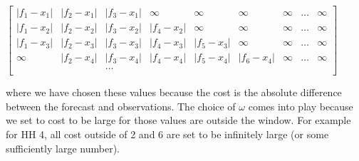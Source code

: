 \documentclass[a4paper]{article}
\begin{document}
\centerline{$\begin{bmatrix}
    |f_1 - x_1| & |f_2 - x_1| & |f_3 - x_1| & \infty  & \infty& \infty & \infty & \dots & \infty \\
    |f_1 - x_2| & |f_2 - x_2| & |f_3 - x_2| &  |f_4 - x_2| & \infty & \infty &\infty & \dots & \infty\\
    |f_1 - x_3| & |f_2 - x_3| & |f_3 - x_3| &  |f_4 - x_3|& |f_5- x_3|& \infty & \infty & \dots  & \infty\\
    \infty & |f_2 - x_4| & |f_3 - x_4| & |f_4 - x_4| &  |f_5 - x_4|& |f_6- x_4|& \infty &\dots & \infty\\
     &  & \dots &  &  & &  & \\
\end{bmatrix}$}
\noindent where we have chosen these values because the cost is the absolute difference between the forecast and observations. The choice of $\omega$ comes into play because we set to cost to be large for those values are outside the window. For example for HH 4, all cost outside of 2 and 6 are set to be infinitely large (or some sufficiently large number).
\end{document}
